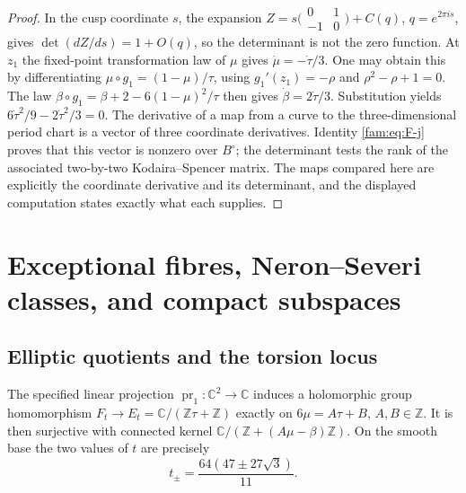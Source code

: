 \begin{proof}
In the cusp coordinate $s$, the expansion
$Z=s\bigl(\begin{smallmatrix}0&1\\-1&0\end{smallmatrix}\bigr)+C(q)$,
$q=e^{2\pi is}$, gives
$\det(dZ/ds)=1+O(q)$, so the determinant is not the zero function.
At $z_1$ the fixed-point transformation law of $\mu$ gives
$\dot\mu=-\dot\tau/3$.  One may obtain this by differentiating
$\mu\circ g_1=(1-\mu)/\tau$, using
$g_1'(z_1)=-\rho$ and $\rho^2-\rho+1=0$.
The law
$\beta\circ g_1=\beta+2-6(1-\mu)^2/\tau$ then gives
$\dot\beta=2\dot\tau/3$.  Substitution yields
$6\dot\tau^2/9-2\dot\tau^2/3=0$.
The derivative of a map from a curve to the three-dimensional period
chart is a vector of three coordinate derivatives.  Identity
\eqref{fam:eq:F-j} proves that this vector is nonzero over $B^\circ$;
the determinant tests the rank of the associated two-by-two
Kodaira--Spencer matrix.  The maps compared here are explicitly the
coordinate derivative and its determinant, and the displayed computation
states exactly what each supplies.
\end{proof}



\section{Exceptional fibres, Neron--Severi classes, and compact subspaces}\label{fam:section:D}
\subsection{Elliptic quotients and the torsion locus}\label{fam:section:D.1}
\begin{proposition}\label{fam:src:D.1.1}\label{fam:st:D.1.1}
The specified linear projection \(\operatorname{pr}_1:\mathbb C^2\to
\mathbb C\) induces a holomorphic group homomorphism
\(F_t\to E_t=\mathbb C/(\mathbb Z\tau+\mathbb Z)\) exactly on
\(6\mu=A\tau+B\), \(A,B\in\mathbb Z\). It is then surjective with
connected kernel
\(\mathbb C/(\mathbb Z+(A\mu-\beta)\mathbb Z)\).
On the smooth base the two values of \(t\) are precisely
\[
 t_\pm=\frac{64(47\pm27\sqrt3)}{11}.
\]
\end{proposition}

